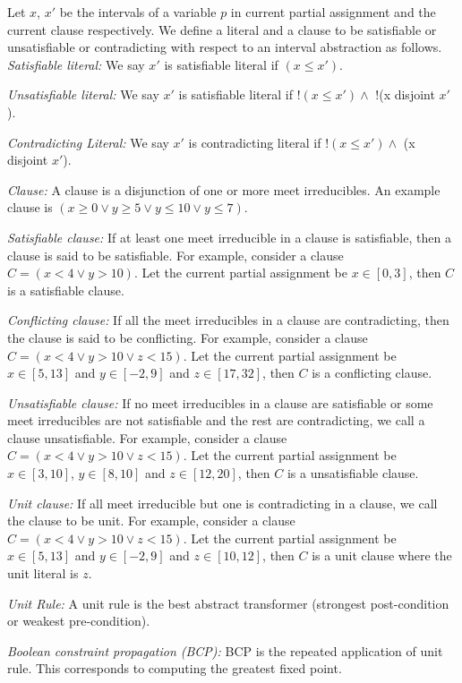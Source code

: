 \documentclass[a4paper,conference]{llncs}
\begin{document}
Let $x$, $x'$ be the intervals of a variable $p$ in current 
partial assignment and the current clause respectively. 
We define a literal and a clause to be satisfiable or unsatisfiable 
or contradicting with respect to an interval abstraction as follows. \\
\textit{Satisfiable literal:} 
We say $x'$ is satisfiable literal if $(x \leq x')$.

\textit{Unsatisfiable literal:}
We say $x'$ is satisfiable literal if $!(x \leq x') \wedge$ $!$(x disjoint $x'$).

\textit{Contradicting Literal:}
We say $x'$ is contradicting literal if $!(x \leq x') \wedge$ (x disjoint $x'$).

\textit{Clause:} A clause is a disjunction of one or more meet irreducibles. An 
example clause is $(x \geq 0 \vee y \geq 5 \vee y \leq 10 \vee y \leq 7)$.

\textit{Satisfiable clause:}
If at least one meet irreducible in a clause is satisfiable, then a clause is said to 
be satisfiable. For example, consider a clause $C=(x<4 \vee y>10)$. Let the 
current partial assignment be $x \in [0,3]$, then $C$ is a satisfiable clause. 

\textit{Conflicting clause:}
If all the meet irreducibles in a clause are contradicting, then the clause is said to
be conflicting. For example, consider a clause $C=(x<4 \vee y>10 \vee z<15)$. Let the 
current partial assignment be $x \in [5,13]$ and $y \in [-2,9]$ and $z \in
[17,32]$, then $C$ is a conflicting clause.

\textit{Unsatisfiable clause:}
If no meet irreducibles in a clause are satisfiable or some meet
irreducibles are not satisfiable and the rest are contradicting, we call a 
clause unsatisfiable. For example, consider a clause $C=(x<4 \vee y>10 \vee z<15)$. 
Let the current partial assignment be $x \in [3,10]$, $y \in [8,10]$ and $z \in [12,20]$, 
then $C$ is a unsatisfiable clause. 

\textit{Unit clause:}
If all meet irreducible but one is contradicting in a clause, we call the clause
to be unit. For example, consider a clause $C=(x<4 \vee y>10 \vee z<15)$. Let the 
current partial assignment be $x \in [5,13]$ and $y \in [-2,9]$ and $z \in
[10,12]$, then $C$ is a unit clause where the unit literal is $z$. 

\textit{Unit Rule:} A unit rule is the best abstract transformer 
(strongest post-condition or weakest pre-condition). 

\textit{Boolean constraint propagation (BCP):} BCP is the repeated 
application of unit rule. This corresponds to computing the greatest fixed point.
\end{document}
